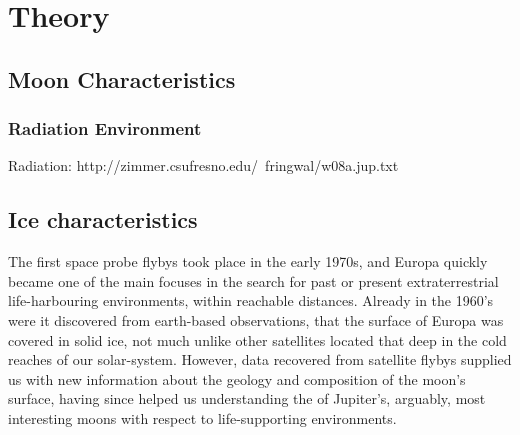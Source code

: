 \chapter{Theory}

\section{Moon Characteristics} %

\subsection{Radiation Environment} \label{chap:radiation}%


Radiation: http://zimmer.csufresno.edu/~fringwal/w08a.jup.txt


\section{Ice characteristics}

The first space probe flybys took place in the early 1970s, and Europa quickly became one of the main focuses in the search for past or present extraterrestrial life-harbouring environments, within reachable distances. Already in the 1960's were it discovered from earth-based observations, that the surface of Europa was covered in solid ice, not much unlike other satellites located that deep in the cold reaches of our solar-system. However, data recovered from satellite flybys supplied us with new information about the geology and composition of the moon's surface, having since helped us understanding the of Jupiter's, arguably, most interesting moons with respect to life-supporting environments.\\
\\
